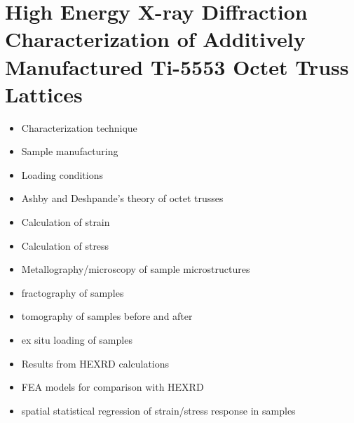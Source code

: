 \chapter{High Energy X-ray Diffraction Characterization of Additively Manufactured Ti-5553 Octet Truss Lattices}
\begin{itemize}
	\item Characterization technique
	\item Sample manufacturing
	\item Loading conditions
	\item Ashby and Deshpande's theory of octet trusses
	\item Calculation of strain
	\item Calculation of stress
	\item Metallography/microscopy of sample microstructures
	\item fractography of samples
	\item tomography of samples before and after
	\item ex situ loading of samples
	\item Results from HEXRD calculations
	\item FEA models for comparison with HEXRD
	\item spatial statistical regression of strain/stress response in samples
\end{itemize}